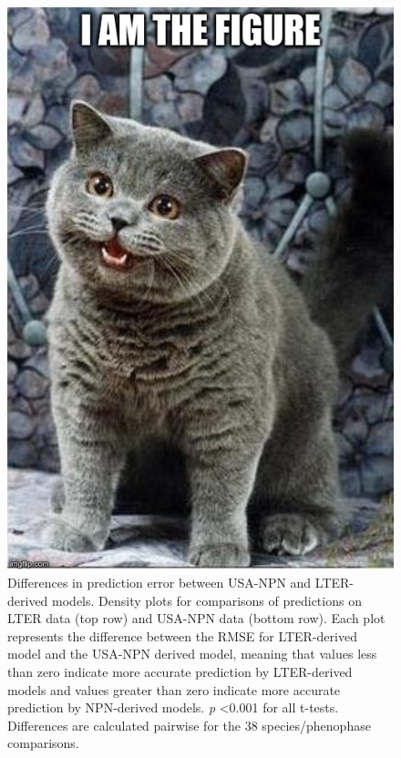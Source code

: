 \begin{figure}
	\centering
		\includegraphics[scale=0.3]{images/figure_filler.jpg}
	\caption[Differences in prediction error between USA-NPN and LTER-derived models]{Differences in prediction error between USA-NPN and LTER-derived models. Density plots for comparisons of predictions on LTER data (top row) and USA-NPN data (bottom row). Each plot represents the difference between the RMSE for LTER-derived model and the USA-NPN derived model, meaning that values less than zero indicate more accurate prediction by LTER-derived models and values greater than zero indicate more accurate prediction by NPN-derived models. \textit{p} <0.001 for all t-tests. Differences are calculated pairwise for the 38 species/phenophase comparisons.} \label{fig-2-4}
\end{figure}

